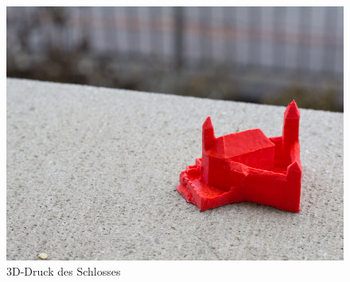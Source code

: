 \begin{figure}[H]
	\centering
	\includegraphics[width=\textwidth]{images/castle-printed-3}
	\caption{3D-Druck des Schlosses}
	\label{img:castle_printed_3}
\end{figure}
